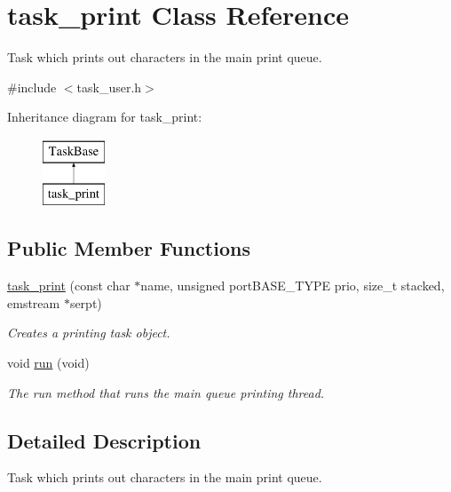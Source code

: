 \hypertarget{classtask__print}{\section{task\-\_\-print Class Reference}
\label{classtask__print}
}


Task which prints out characters in the main print queue.  




{\ttfamily \#include $<$task\-\_\-user.\-h$>$}

Inheritance diagram for task\-\_\-print\-:\begin{figure}[H]
\begin{center}
\leavevmode
\includegraphics[height=2.000000cm]{classtask__print}
\end{center}
\end{figure}
\subsection*{Public Member Functions}
\begin{DoxyCompactItemize}
\item 
\hyperlink{classtask__print_abd3e08a5c207a448b6083e200019d4a3}{task\-\_\-print} (const char $\ast$name, unsigned port\-B\-A\-S\-E\-\_\-\-T\-Y\-P\-E prio, size\-\_\-t stacked, emstream $\ast$serpt)
\begin{DoxyCompactList}\small\item\em Creates a printing task object. \end{DoxyCompactList}\item 
void \hyperlink{classtask__print_a568efc42203ca707a55ec464c6f420b9}{run} (void)
\begin{DoxyCompactList}\small\item\em The run method that runs the main queue printing thread. \end{DoxyCompactList}\end{DoxyCompactItemize}


\subsection{Detailed Description}
Task which prints out characters in the main print queue. 

